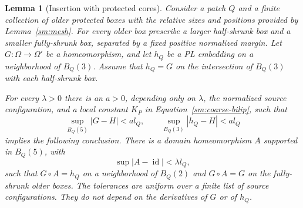 \documentclass[11pt]{article}
\numberwithin{equation}{section}
\newtheorem{lemma}[theorem]{Lemma}
\theoremstyle{definition}
\theoremstyle{remark}
\newcommand{\Id}{\operatorname{id}}
\begin{document}
\begin{lemma}[Insertion with protected cores]
\label{sm:insertion}
Consider a patch $Q$ and a finite collection of older protected
boxes with the relative sizes and positions provided by
Lemma~\ref{sm:mesh}.  For every older box prescribe a larger
half-shrunk box and a smaller fully-shrunk box, separated by a
fixed positive normalized margin.  Let $G:\Omega\to\Omega'$ be
a homeomorphism, and let $h_Q$ be a PL embedding on a neighborhood
of $B_Q(3)$.  Assume that $h_Q=G$ on the intersection of
$B_Q(3)$ with each half-shrunk box.

For every $\lambda>0$ there is an $a>0$, depending only on
$\lambda$, the normalized source configuration, and a local
constant $K_P$ in Equation~\eqref{sm:coarse-bilip}, such that
\begin{equation}
 \label{sm:insertion-smallness}
 \sup_{B_Q(5)}|G-H|<a l_Q,
 \qquad \sup_{B_Q(3)}|h_Q-H|<a l_Q
\end{equation}
implies the following conclusion.  There is a domain
homeomorphism $A$ supported in $B_Q(5)$, with
\[
 \sup|A-\Id|<\lambda l_Q,
\]
such that $G\circ A=h_Q$ on a neighborhood of $B_Q(2)$ and
$G\circ A=G$ on the fully-shrunk older boxes.  The tolerances
are uniform over a finite list of source configurations.  They
do not depend on the derivatives of $G$ or of $h_Q$.
\end{lemma}
\end{document}
